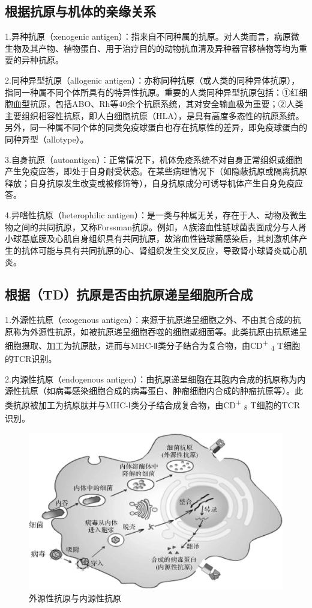 \subsection{根据抗原与机体的亲缘关系}

1.异种抗原（xenogenic
antigen）：指来自不同种属的抗原。对人类而言，病原微生物及其产物、植物蛋白、用于治疗目的的动物抗血清及异种器官移植物等均为重要的异种抗原。

2.同种异型抗原（allogenic
antigen）：亦称同种抗原（或人类的同种异体抗原），指同一种属不同个体所具有的特异性抗原。重要的人类同种异型抗原包括：①红细胞血型抗原，包括ABO、Rh等40余个抗原系统，其对安全输血极为重要；②人类主要组织相容性抗原，即人白细胞抗原（HLA），是具有高度多态性的抗原系统。另外，同一种属不同个体的同类免疫球蛋白也存在抗原性的差异，即免疫球蛋白的同种异型（allotype）。

3.自身抗原（autoantigen）：正常情况下，机体免疫系统不对自身正常组织或细胞产生免疫应答，即处于自身耐受状态。在某些病理情况下（如隐蔽抗原或隔离抗原释放；自身抗原发生改变或被修饰等），自身抗原成分可诱导机体产生自身免疫应答。

4.异嗜性抗原（heterophilic
antigen）：是一类与种属无关，存在于人、动物及微生物之间的共同抗原，又称Forssman抗原。例如，A族溶血性链球菌表面成分与人肾小球基底膜及心肌自身组织具有共同抗原，故溶血性链球菌感染后，其刺激机体产生的抗体可能与具有共同抗原的心、肾组织发生交叉反应，导致肾小球肾炎或心肌炎。


\subsection{根据（TD）抗原是否由抗原递呈细胞所合成}

1.外源性抗原（exogenous
antigen）：来源于抗原递呈细胞之外、不由其合成的抗原称为外源性抗原，如被抗原递呈细胞吞噬的细胞或细菌等。此类抗原由抗原递呈细胞摄取、加工为抗原肽，进而与MHC-Ⅱ类分子结合为复合物，由CD\textsuperscript{+}
\textsubscript{4} T细胞的TCR识别。

2.内源性抗原（endogenous
antigen）：由抗原递呈细胞在其胞内合成的抗原称为内源性抗原（如病毒感染细胞合成的病毒蛋白、肿瘤细胞内合成的肿瘤抗原等）。此类抗原被加工为抗原肽并与MHC-Ⅰ类分子结合成复合物，由CD\textsuperscript{+}
\textsubscript{8} T细胞的TCR识别。

\begin{figure}[!htbp]
 \centering
 \includegraphics{./images/Image00057.jpg}
 \captionsetup{justification=centering}
 \caption{外源性抗原与内源性抗原}
 \label{fig3-8}
  \end{figure}


